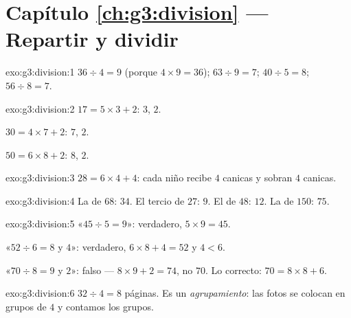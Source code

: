 \section*{Capítulo \ref{ch:g3:division} --- Repartir y dividir}

\begin{solution}{exo:g3:division:1}
$36 \div 4 = 9$ (porque $4 \times 9 = 36$); \quad
$63 \div 9 = 7$; \quad $40 \div 5 = 8$; \quad $56 \div 8 = 7$.
\end{solution}

\begin{solution}{exo:g3:division:2}
$17 = 5 \times 3 + 2$:  $3$,  $2$.

$30 = 4 \times 7 + 2$:  $7$,  $2$.

$50 = 6 \times 8 + 2$:  $8$,  $2$.
\end{solution}

\begin{solution}{exo:g3:division:3}
$28 = 6 \times 4 + 4$: cada niño recibe $4$ canicas y sobran
$4$ canicas.
\end{solution}

\begin{solution}{exo:g3:division:4}
La  de $68$: $34$. El tercio de $27$: $9$. El  de $48$: $12$. La 
de $150$: $75$.
\end{solution}

\begin{solution}{exo:g3:division:5}
«$45 \div 5 = 9$»: verdadero, $5 \times 9 = 45$.

«$52 \div 6 = 8$ y  $4$»: verdadero, $6 \times 8 + 4 = 52$ y
$4 < 6$.

«$70 \div 8 = 9$ y  $2$»: falso --- $8 \times 9 + 2 = 74$,
no $70$. Lo correcto: $70 = 8 \times 8 + 6$.
\end{solution}

\begin{solution}{exo:g3:division:6}
$32 \div 4 = 8$ páginas. Es un \emph{agrupamiento}: las fotos se colocan
en grupos de $4$ y contamos los grupos.
\end{solution}

